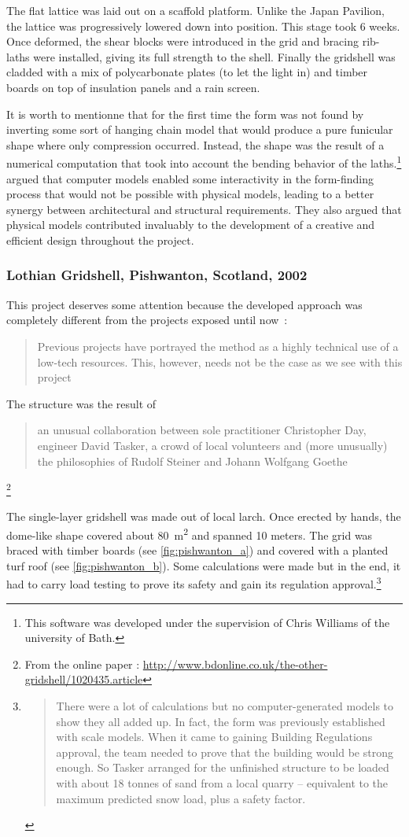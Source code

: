 The flat lattice was laid out on a scaffold platform. Unlike the Japan Pavilion, the lattice was progressively lowered down into position. This stage took 6 weeks. Once deformed, the shear blocks were introduced in the grid and bracing rib-laths were installed, giving its full strength to the shell. Finally the gridshell was cladded with a mix of polycarbonate plates (to let the light in) and timber boards on top of insulation panels and a rain screen.

It is worth to mentionne that for the first time the form was not found by inverting some sort of hanging chain model that would produce a pure funicular shape where only compression occurred. Instead, the shape was the result of a numerical computation that took into account the bending behavior of the laths.\footnote{This software was developed under the supervision of Chris Williams of the university of Bath.} \citet{Harris2003} argued that computer models enabled some interactivity in the form-finding process that would not be possible with physical models, leading to a better synergy between architectural and structural requirements. They also argued that physical models contributed invaluably to the development of a creative and efficient design throughout the project.

\subsubsection{Lothian Gridshell, Pishwanton, Scotland, 2002}
This project deserves some attention because the developed approach was completely different from the projects exposed until now~: \blockcquote[]{Lowenstein2002}{Previous projects have portrayed the method as a highly technical use of a low-tech resources. This, however, needs not be the case as we see with this project \belp{}}. The structure was the result of \blockcquote[]{bdonline2002}{\belp{} an unusual collaboration between sole practitioner Christopher Day, engineer David Tasker, a crowd of local volunteers and (more unusually) the philosophies of Rudolf Steiner and Johann Wolfgang Goethe}.\footnote{From the online paper  : \url{http://www.bdonline.co.uk/the-other-gridshell/1020435.article}}

The single-layer gridshell was made out of local larch. Once erected by hands, the dome-like shape covered about \SI{80}{m^2} and spanned 10 meters. The grid was braced with timber boards (see \cref{fig:pishwanton_a}) and covered with a planted turf roof (see \cref{fig:pishwanton_b}). Some calculations were made but in the end, it had to carry load testing to prove its safety and gain its regulation approval.\footnote{\blockcquote[]{bdonline2002}{There were a lot of calculations but no computer-generated models to show they all added up. In fact, the form was previously established with scale models. When it came to gaining Building Regulations approval, the team needed to prove that the building would be strong enough. So Tasker arranged for the unfinished structure to be loaded with about 18 tonnes of sand from a local quarry – equivalent to the maximum predicted snow load, plus a safety factor.}}

